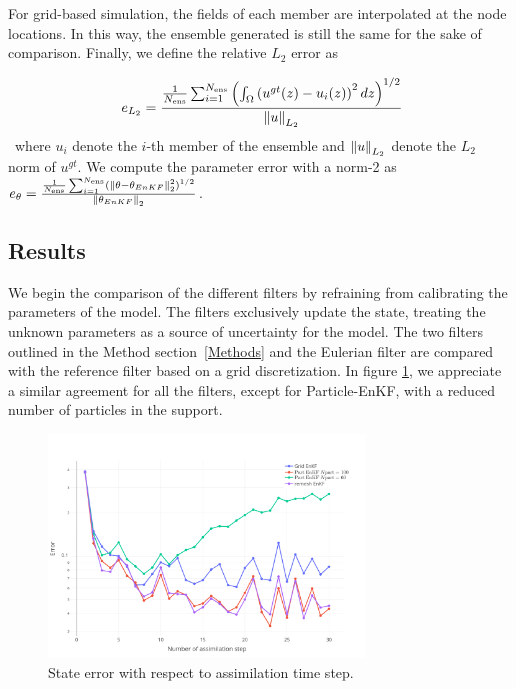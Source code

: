 For grid-based simulation, the fields of each member are interpolated at the node locations. In this way, the ensemble generated is still the same for the sake of comparison.
Finally, we define the relative $L_2$ error as

\begin{equation}~\label{eq:L2_error}
	e_{L_2} =\frac{ \frac1{N_{\text{ens}}} \sum_{i = 1}^{N_{\text{ens}}} \left(\int_\Omega \left(u^{gt}(z) - u_i(z)\right)^2 dz\right)^{1/2}}{\left\lVert u \right\rVert_{L_2}}
\end{equation}~where $u_i$ denote the $i$-th member of the ensemble and $\left\lVert u \right\rVert_{L_2}$ denote the $L_2$ norm of $u^{gt}$. We compute the parameter error with a norm-2 as $e_{\theta} = \frac{\frac1{N_{\text{ens}}} \sum_{i = 1}^{N_{\text{ens}}}  (\left\lVert \theta - \theta_{EnKF} \right\rVert_2^2)^{1/2}}{\left\lVert \theta_{EnKF} \right\rVert_2}$.

\subsection{Results}

We begin the comparison of the different filters by refraining from calibrating the parameters of the model. The filters exclusively update the state, treating the unknown parameters as a source of uncertainty for the model. The two filters outlined in the Method section~\ref{Methods} and the Eulerian filter are compared with the reference filter based on a grid discretization.
In figure \ref{fig:1d_error_time}, we appreciate a similar agreement for all the filters, except for Particle-EnKF, with a reduced number of particles in the support.

\begin{figure}
	\centering
	\includegraphics[width=0.75\textwidth]{images/app1d/wo_calibration/state_error.png}
	\caption{State error with respect to assimilation time step.}
	\label{fig:1d_error_time}
\end{figure}

